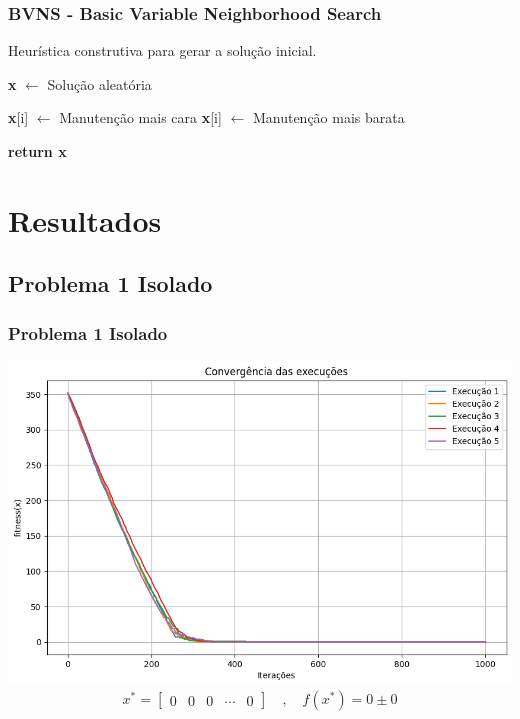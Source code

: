 \documentclass{beamer}
\begin{document}
    \begin{frame}
        \frametitle{BVNS - Basic Variable Neighborhood Search}
        \begin{algorithm}[H]
            \caption{Heurística construtiva para gerar a solução inicial.}\label{alg:sol-inicial}
            \begin{algorithmic}[1]

            \State \textbf{x} $\gets$ Solução aleatória

                    \State \textbf{x}[i] $\gets$ Manutenção mais cara
                \Else
                    \State \textbf{x}[i] $\gets$ Manutenção mais barata
                \EndIf
            \EndFor
               
            \Statex
            \State \textbf{return x} 
            \EndProcedure 
            \end{algorithmic}
        \end{algorithm}
    \end{frame}

\section{Resultados}

\subsection{Problema 1 Isolado}
    \begin{frame}
        \frametitle{Problema 1 Isolado}

        \centering
        \includegraphics[width=\textwidth,trim=1 1 1 1,clip]{images/convergencia_execucoes_p1.png}
        \[  x^* = \begin{bmatrix} 0 & 0 & 0 & \cdots & 0 \end{bmatrix} \quad , \quad f\left(x^*\right) = 0 \pm 0 \]
    \end{frame}
\end{document}
